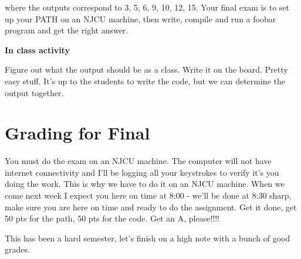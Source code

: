 \documentclass[12pt]{article}
\begin{document}
 where the outputs correspond to 3, 5, 6, 9, 10, 12, 15. Your final exam is to
set up your PATH on an NJCU machine, then write, compile and run a foobar
program and get the right answer.

{\LARGE\textbf{In class activity}}

\begin{center}
{\LARGE Figure out what the output should be as a class. Write it on the board.
Pretty easy stuff. It's up to the students to write the code, but we can
determine the output together. }
\end{center}

\section{Grading for Final}
You must do the exam on an NJCU machine. The computer will not have internet
connectivity and I'll be logging all your keystrokes to verify it's you doing
the work. This is why we have to do it on an NJCU machine. When we come next
week I expect you here on time at 8:00 - we'll be done at 8:30 sharp, make sure
you are here on time and ready to do the assignment. Get it done, get 50 pts for
the path, 50 pts for the code. Get an A, please!!!!

This has been a hard semester, let's finish on a high note with a bunch of good
grades.
\end{document}
